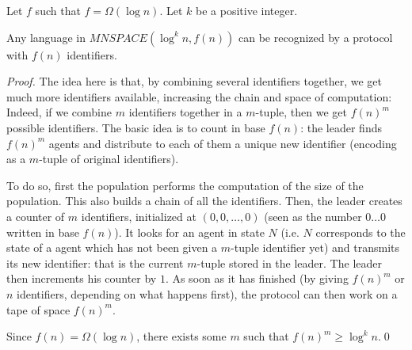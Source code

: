 \documentclass[UKenglish]{llncs}
\newcommand\id{identifier}
\begin{document}
\begin{proposition}\label{prop:truc}
Let $f$ such that $f=\Omega(\log n)$.
Let $k$ be a positive integer.

Any language in $MNSPACE\left(\log^kn,f(n)\right)$ can be recognized by a protocol
with $f(n)$ identifiers.
\end{proposition}

\begin{proof}
The idea here is that, by combining several identifiers together, we get much more identifiers available, increasing
the chain and space of computation: Indeed, if we combine $m$ {\id}s together
in a $m$-tuple, then we get $f(n)^m$ possible identifiers. The basic idea is to
count in base $f(n)$: the leader finds $f(n)^m$ agents and
distribute to each of them a unique new identifier (encoding as a $m$-tuple of
original identifiers). 

To do so, first the population performs the computation of the size of
the population. This also builds a chain of
all the identifiers. Then, the leader creates a counter of $m$ identifiers, initialized at $(0,0,\dots,0)$ (seen as the number
$0\ldots0$ written in base $f(n)$). It looks for an agent in state $N$
(i.e. $N$ corresponds to the state of a agent which has not been given
a $m$-tuple identifier yet) and transmits its new identifier: that is the
current $m$-tuple stored in the leader. The leader then increments his
counter by $1$. As soon as it has finished (by giving $f(n)^m$ or $n$ identifiers, depending on what happens first),
the protocol can then work on a tape of space $f(n)^m$.

Since $f(n)=\Omega(\log n)$, there exists some $m$ such that $f(n)^m\ge \log^kn$.\hfill \qed

 \end{proof}
\end{document}

